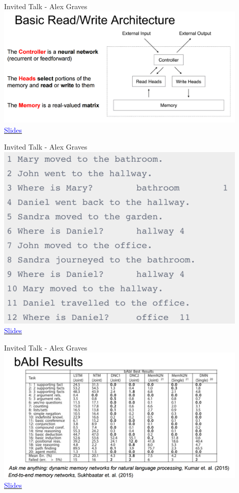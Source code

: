 \documentclass[]{beamer}
\begin{document}
\begin{frame}{Invited Talk - Alex Graves}
\centering
\includegraphics[width=0.9\textwidth]{figures/graves-architecture} \\
\href{http://iclr.cc/lib/exe/fetch.php?media=iclr2017:graves\_iclr2017.pdf}{\textcolor{blue}{Slides}}
\end{frame}

\begin{frame}{Invited Talk - Alex Graves}
\centering
\includegraphics[width=0.9\textwidth]{figures/graves-babi} \\
\href{http://iclr.cc/lib/exe/fetch.php?media=iclr2017:graves\_iclr2017.pdf}{\textcolor{blue}{Slides}}
\end{frame}

\begin{frame}{Invited Talk - Alex Graves}
\centering
\includegraphics[width=0.9\textwidth]{figures/graves-results} \\
\href{http://iclr.cc/lib/exe/fetch.php?media=iclr2017:graves\_iclr2017.pdf}{\textcolor{blue}{Slides}}
\end{frame}
\end{document}
